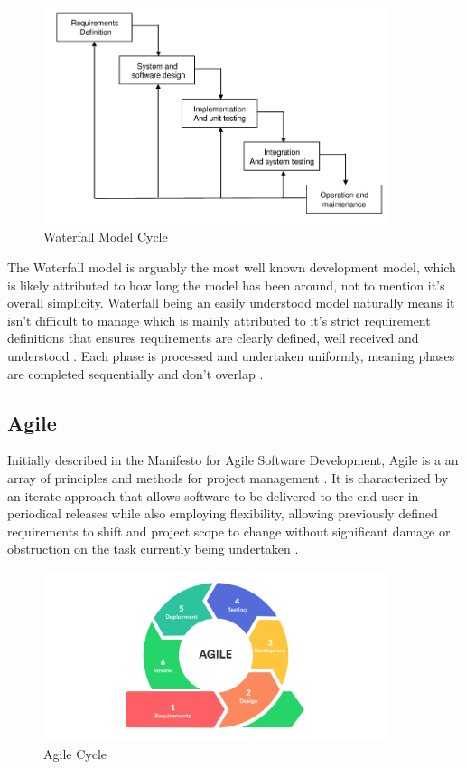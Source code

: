 \begin{figure}[H]
	\caption{Waterfall Model Cycle}
	\label{image:waterfall}
	\centering
	\includegraphics[width=0.9\textwidth]{images/waterfall.png}
\end{figure}	

The Waterfall model is arguably the most well known development model, which is likely attributed to how long the model has been around, not to mention it's overall simplicity. Waterfall being an easily understood model naturally means it isn't difficult to manage which is mainly attributed to it's strict requirement definitions that ensures requirements are clearly defined, well received and understood \cite{WATERFALL}. Each phase is processed and undertaken uniformly, meaning phases are completed sequentially and don't overlap \cite{WATERFALL_REVIEW}.

\subsection{Agile}
Initially described in the Manifesto for Agile Software Development, Agile is a an array of principles and methods for project management \cite{AGILE_MANIFESTO}. It is characterized by an iterate approach that allows software to be delivered to the end-user in periodical releases while also employing flexibility, allowing previously defined requirements to shift and project scope to change without significant damage or obstruction on the task currently being undertaken \cite{AGILE}.

\begin{figure}[H]
	\caption{Agile Cycle}
	\label{image:myImageName}
	\centering
	\includegraphics[width=0.9\textwidth]{images/agile.png}
\end{figure}	


